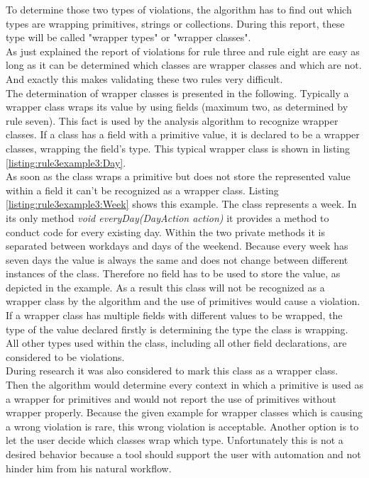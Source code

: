 To determine those two types of violations, the algorithm has to find out which types are wrapping primitives, strings or collections. During this report, these type will be called "wrapper types" or "wrapper classes". 
\\

As just explained the report of violations for rule three and rule eight are easy as long as it can be determined which classes are wrapper classes and which are not. And exactly this makes validating these two rules very difficult. 
\\

The determination of wrapper classes is presented in the following. Typically a wrapper class wraps its value by using fields (maximum two, as determined by rule seven). This fact is used by the analysis algorithm to recognize wrapper classes. If a class has a field with a primitive value, it is declared to be a wrapper classes, wrapping the field's type. This typical wrapper class is shown in listing \ref{listing:rule3example3:Day}. 
\\

As soon as the class wraps a primitive but does not store the represented value within a field it can't be recognized as a wrapper class. Listing \ref{listing:rule3example3:Week} shows this example. The class represents a week. In its only method \textit{void everyDay(DayAction action)} it provides a method to conduct code for every existing day. Within the two private methods it is separated between workdays and days of the weekend. Because every week has seven days the value is always the same and does not change between different instances of the class. Therefore no field has to be used to store the value, as depicted in the example. As a result this class will not be recognized as a wrapper class by the algorithm and the use of primitives would cause a violation. 
\\

If a wrapper class has multiple fields with different values to be wrapped, the type of the value declared firstly is determining the type the class is wrapping. All other types used within the class, including all other field declarations, are considered to be violations. 
\\

During research it was also considered to mark this class as a wrapper class. Then the algorithm would determine every context in which a primitive is used as a wrapper for primitives and would not report the use of primitives without wrapper properly. Because the given example for wrapper classes which is causing a wrong violation is rare, this wrong violation is acceptable. Another option is to let the user decide which classes wrap which type. Unfortunately this is not a desired behavior because a tool should support the user with automation and not hinder him from his natural workflow. 
\\


